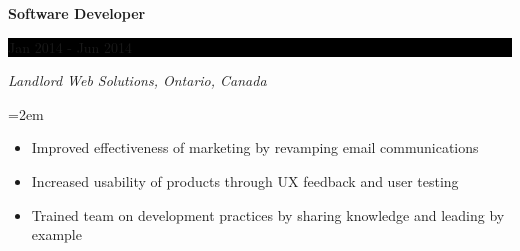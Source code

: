 \documentclass[paper=a4,fontsize=11pt]{scrartcl} %
\newcommand{\EducationEntry}[4]{
    \noindent \textbf{#1} \hfill      %
    \colorbox{Black}{
      \parbox{8.5em}{
      \hfill\color{White}#2}} \par  %
    \noindent \textit{#3} \par        %
    \noindent\hangindent=2em\hangafter=0 \small #4 %
    \normalsize \par}
\newcommand{\WorkEntry}[4]{       %
    \noindent \textbf{#1} \hfill      %
    \colorbox{Black}{%
      \parbox{9em}{%
      \hfill\color{White}#2}} \par   %
        \noindent \textit{#3} \par        %
    \noindent\hangindent=2em\hangafter=0 \small #4 %
    \normalsize \par}
\begin{document}
\WorkEntry{Software Developer}{Jan 2014 - Jun 2014}
{Landlord Web Solutions, Ontario, Canada}
{
 \begin{itemize} \itemsep -1pt
   \item Improved effectiveness of marketing by revamping email communications
   \item Increased usability of products through UX feedback and user testing
   \item Trained team on development practices by sharing knowledge and leading by example

\end{itemize}}
\end{document}
